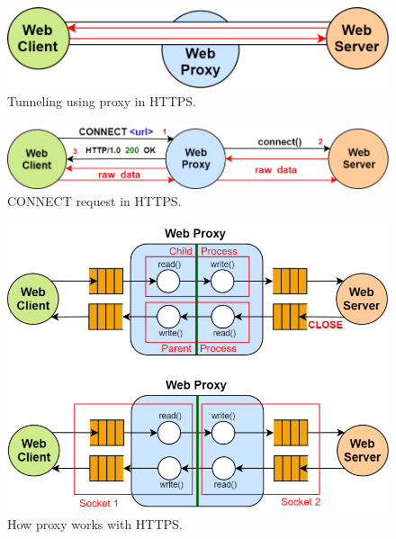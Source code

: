 \begin{itemize}
{\begin{itemize}
{\begin{figure}[h]
\centering
\includegraphics[scale=0.4]{Images/HTTP/proxy_4}
\caption{\footnotesize{Tunneling using proxy in HTTPS.}}\label{proxy_4}
\end{figure}
\begin{figure}[h]
\centering
\includegraphics[scale=0.5]{Images/HTTP/connect_HTTPS}
\caption{\footnotesize{CONNECT request in HTTPS.}}\label{connect_HTTPS}
\end{figure}
\begin{figure}[h]
\centering
\includegraphics[scale=0.55]{Images/HTTP/proxy_HTTPS}
\caption{\footnotesize{How proxy works with HTTPS.}}\label{proxy_HTTPS}
\end{figure}
}
\end{itemize}
}
\end{itemize} 